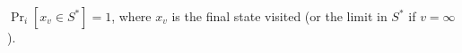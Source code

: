 $\Pr_i[x_v \in S^*] = 1$, where $x_v$ is the final state visited (or the limit in $S^*$ if $v = \infty$).
